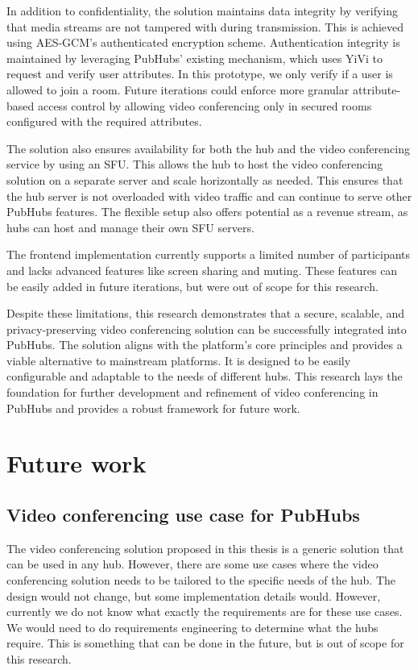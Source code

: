 \documentclass{report}
\begin{document}
In addition to confidentiality, the solution maintains data integrity by verifying that media streams are not
tampered with during transmission. This is achieved using AES-GCM’s authenticated encryption scheme. Authentication
integrity is maintained by leveraging PubHubs’ existing mechanism, which uses YiVi to request and verify user
attributes. In this prototype, we only verify if a user is allowed to join a room. Future iterations could enforce
more granular attribute-based access control by allowing video conferencing only in secured rooms configured with
the required attributes.

The solution also ensures availability for both the hub and the video conferencing service by using an SFU. This
allows the hub to host the video conferencing solution on a separate server and scale horizontally as needed. This
ensures that the hub server is not overloaded with video traffic and can continue to serve other PubHubs features.
The flexible setup also offers potential as a revenue stream, as hubs can host and manage their own SFU servers.

The frontend implementation currently supports a limited number of participants and lacks advanced features like
screen sharing and muting. These features can be easily added in future iterations, but were out of scope for this
research.

Despite these limitations, this research demonstrates that a secure, scalable, and privacy-preserving video
conferencing solution can be successfully integrated into PubHubs. The solution aligns with the platform’s core
principles and provides a viable alternative to mainstream platforms. It is designed to be easily configurable and
adaptable to the needs of different hubs. This research lays the foundation for further development and refinement
of video conferencing in PubHubs and provides a robust framework for future work.

\chapter{Future work}
\section{Video conferencing use case for PubHubs}
The video conferencing solution proposed in this thesis is a generic solution that can be used in any hub. However,
there are some use cases where the video conferencing solution needs to be tailored to the specific needs of the hub.
The design would not change, but some implementation details would. However, currently we do not know what exactly the
requirements are for these use cases. We would need to do requirements engineering to determine what the hubs require.
This is something that can be done in the future, but is out of scope for this research.
\end{document}
